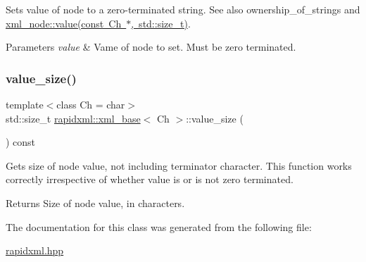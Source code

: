 Sets value of node to a zero-\/terminated string. See also ownership\+\_\+of\+\_\+strings and \mbox{\hyperlink{classrapidxml_1_1xml__base_a3b183c2db7022a6d30494dd2f0ac11e9}{xml\+\_\+node\+::value(const Ch $\ast$, std\+::size\+\_\+t)}}. 
\begin{DoxyParams}{Parameters}
{\em value} & Vame of node to set. Must be zero terminated. \\
\hline
\end{DoxyParams}
\mbox{\label{classrapidxml_1_1xml__base_a2eb123d471b1567fa4832b6ee2b75493}} 
\subsubsection{\texorpdfstring{value\+\_\+size()}{value\_size()}}
{\footnotesize\ttfamily template$<$class Ch  = char$>$ \\
std\+::size\+\_\+t \mbox{\hyperlink{classrapidxml_1_1xml__base}{rapidxml\+::xml\+\_\+base}}$<$ Ch $>$\+::value\+\_\+size (\begin{DoxyParamCaption}{ }\end{DoxyParamCaption}) const\hspace{0.3cm}{\ttfamily [inline]}}

Gets size of node value, not including terminator character. This function works correctly irrespective of whether value is or is not zero terminated. \begin{DoxyReturn}{Returns}
Size of node value, in characters. 
\end{DoxyReturn}


The documentation for this class was generated from the following file\+:\begin{DoxyCompactItemize}
\item 
\mbox{\hyperlink{rapidxml_8hpp}{rapidxml.\+hpp}}\end{DoxyCompactItemize}
